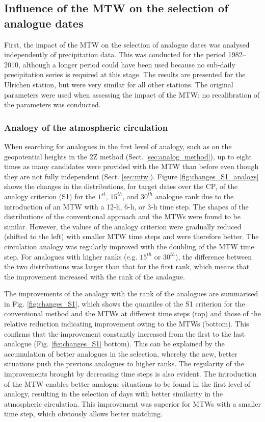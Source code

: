 \documentclass[hess, manuscript]{copernicus}
\begin{document}
	\subsection{Influence of the MTW on the selection of analogue dates}
	\label{sec:influence_analogue_dates}
	
	First, the impact of the MTW on the selection of analogue dates was analysed independently of precipitation data. This was conducted for the period 1982--2010, although a longer period could have been used because no sub-daily precipitation series is required at this stage. The results are presented for the Ulrichen station, but were very similar for all other stations. The original parameters were used when assessing the impact of the MTW; no recalibration of the parameters was conducted.
	
	\subsubsection{Analogy of the atmospheric circulation}
	\label{sec:changes_analogy_circul}
	
	When searching for analogues in the first level of analogy, such as on the geopotential heights in the 2Z method (Sect. \ref{sec:analog_method}), up to eight times as many candidates were provided with the MTW than before even though they are not fully independent (Sect. \ref{sec:mtw}). Figure \ref{fig:changes_S1_analogs} shows the changes in the distributions, for target dates over the CP, of the analogy criterion (S1) for the $1^{st}$, $15^{th}$, and $30^{th}$ analogue rank due to the introduction of an MTW with a 12-h, 6-h, or 3-h time step. The shapes of the distributions of the conventional approach and the MTWs were found to be similar. However, the values of the analogy criterion were gradually reduced (shifted to the left) with smaller MTW time steps and were therefore better. The circulation analogy was regularly improved with the doubling of the MTW time step. For analogues with higher ranks (e.g. $15^{th}$ or $30^{th}$), the difference between the two distributions was larger than that for the first rank, which means that the improvement increased with the rank of the analogue. 
	
	The improvements of the analogy with the rank of the analogues are summarised in Fig. \ref{fig:changes_S1}, which shows the quantiles of the S1 criterion for the conventional method and the MTWs at different time steps (top) and those of the relative reduction indicating improvement owing to the MTWs (bottom). This confirms that the improvement constantly increased from the first to the last analogue (Fig. \ref{fig:changes_S1} bottom). This can be explained by the accumulation of better analogues in the selection, whereby the new, better situations push the previous analogues to higher ranks. The regularity of the improvements brought by decreasing time steps is also evident. The introduction of the MTW enables better analogue situations to be found in the first level of analogy, resulting in the selection of days with better similarity in the atmospheric circulation. This improvement was superior for MTWs with a smaller time step, which obviously allows better matching.
	
\end{document}
